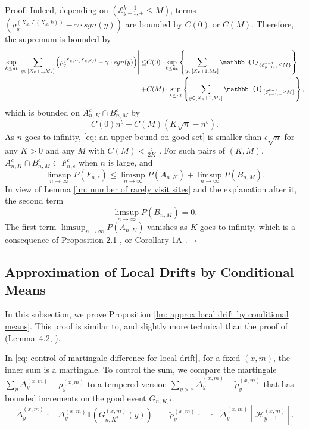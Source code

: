 \documentclass[twoside,12pt,a4paper]{article}
\numberwithin{equation}{section}
\newenvironment{proof}[1][Proof]{{\sc #1}:}{~\hfill $\square$}
\newcommand{\abs}[1]{\left\vert #1 \right\vert}
\begin{document}
\begin{proof}
	Indeed, depending on $(\mathcal{E}^{k-1}_{y-1,+} \leq M)$, terms  $\left( \rho^{(X_k,L(X_k,k))}_y -  \gamma \cdot sgn(y) \right)$ are bounded by $C(0)$ or $C(M)$. Therefore, the supremum is bounded by
	\begin{align*}
	 \sup_{k\leq n t}  \abs{  	\sum_{y\in [X_{k}+1 ,M_k]} \left( \rho^{(X_k,L(X_k,k))}_y -  \gamma \cdot sgn(y) \right) } \leq &  
	 C(0) \cdot \sup_{k\leq n t} \left\{   	\sum_{y\in [X_{k}+1 ,M_k]} \mathbb{1}_{ \{ \mathcal{E}^{k-1}_{y-1,+} \leq M \} } \right\}
	 \notag
	 \\
	 +& C(M) \cdot \sup_{k\leq n t} \left\{   	\sum_{y\in [X_{k}+1 ,M_k]} \mathbb{1}_{ \{ \mathcal{E}^{k-1}_{y-1,+} \geq M \} } \right\},
\end{align*} which is bounded on $A^c_{n,K} \cap B^c_{n,M}$ by
\begin{equation}\label{eq: an upper bound on good set}
	C(0)n^b  + C(M) \left(K \sqrt{n} -n^b\right).
\end{equation} As $n$ goes to infinity, \eqref{eq: an upper bound on good set} is smaller than $\epsilon \sqrt{n}$ for any $K>0$ and any $M$ with $C(M) < \frac{\epsilon}{2K}$ . 
For such pairs of $(K,M)$, $A^c_{n,K} \cap B^c_{n,M} \subset F^c_{n,\epsilon}$ when $n$ is large,  and 
$$
\limsup_{n\to \infty} P(F_{n,\epsilon}) \leq \limsup_{n\to \infty}  P(A_{n,K}) +  \limsup_{n\to \infty}  P(B_{n,M}).
$$ In view of Lemma \ref{lm: number of rarely visit sites} and the explanation after it, the second term $$\limsup_{n\to \infty}  P(B_{n,M})=0.$$  The first term $\limsup_{n\to \infty}  P(A_{n,K}) $ vanishes as $K$ goes to infinity, which is a consequence of Proposition 2.1 \cite{KMP22}, or Corollary 1A \cite{T96}.
\end{proof}


\subsection{Approximation of Local Drifts by Conditional Means}
\label{sec:DeltaRho}
In this subsection, we prove Proposition \ref{lm: approx local drift by conditional means}. This proof is similar to, and slightly more technical than the proof of (Lemma~4.2, \cite{KP16}). 

In \eqref{eq: control of martingale difference for local drift}, for a fixed $(x,m)$, the inner sum is a martingale. To control the sum, we compare the martingale $\sum_y \Delta_y^{(x,m)} - \rho_y^{(x,m)}$ to a tempered version $\sum_{y > x} \tilde \Delta_{y}^{(x,m)} - \tilde\rho_y^{(x,m)}$ that has bounded increments on the good event $G_{n, K, t}$.
\[
	\tilde \Delta_y^{(x,m)} := \Delta_y ^{(x,m)} \mathbf{1}\left( G_{n, K^2}^{(x,m)} (y)\right) \qquad
	\tilde \rho_y^{(x,m)} := \mathbb{E}\left[ \tilde\Delta_y^{(x,m)} \middle| \mathcal{H}_{y-1}^{(x,m)} \right]  
.\] 
\end{document}
